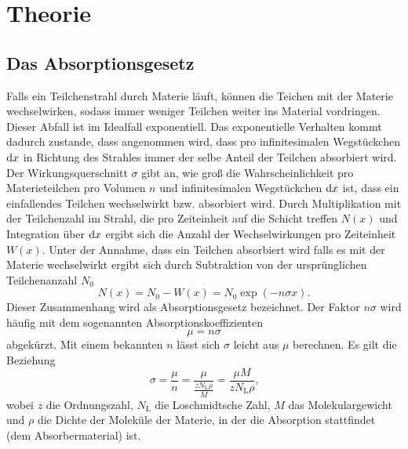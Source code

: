 
\section{Theorie}
\label{sec:Theorie}

\subsection{Das Absorptionsgesetz}
Falls ein Teilchenstrahl durch Materie läuft, können die Teichen mit der Materie wechselwirken, sodass immer weniger Teilchen weiter ins Material vordringen. Dieser Abfall ist im Idealfall exponentiell. Das exponentielle Verhalten kommt dadurch zustande, dass angenommen wird, dass pro infinitesimalen Wegstückchen $\mathop{}\!\mathrm{d} x$ in Richtung des Strahles immer der selbe Anteil der Teilchen absorbiert wird. Der Wirkungsquerschnitt $\sigma$ gibt an, wie groß die Wahrscheinlichkeit pro Materieteilchen pro Volumen $n$ und infinitesimalen Wegstückchen $\mathop{}\!\mathrm{d} x$ ist, dass ein einfallendes Teilchen wechselwirkt bzw. absorbiert wird. Durch Multiplikation mit der Teilchenzahl im Strahl, die pro Zeiteinheit auf die Schicht treffen $N(x)$ und Integration über $\mathop{}\!\mathrm{d} x$ ergibt sich die Anzahl der Wechselwirkungen pro Zeiteinheit $W(x)$. Unter der Annahme, dass ein Teilchen absorbiert wird falls es mit der Materie wechselwirkt ergibt sich durch Subtraktion von der ursprünglichen Teilchenanzahl $N_0$
\begin{equation}
	N(x)=N_0-W(x)=N_0 \exp(-n \sigma x)\text{.}
\end{equation}
Dieser Zusammenhang wird als Absorptionsgesetz bezeichnet. 
Der Faktor $n \sigma$ wird häufig mit dem sogenannten Absorptionskoeffizienten
\begin{equation}
	\mu = n \sigma
\end{equation}
abgekürzt. Mit einem bekannten $n$ lässt sich $\sigma$ leicht aus $\mu$ berechnen.
Es gilt die Beziehung
\begin{equation}
	\sigma = \frac{\mu}{n}=\frac{\mu}{\frac{z N_\text{L} \rho}{M}}=\frac{\mu M}{z N_\text{L} \rho}\text{,}\label{eq:HJHKJ}
\end{equation}
wobei $z$ die Ordnungszahl, $N_\text{L}$ die Loschmidtsche Zahl, $M$ das Molekulargewicht und $\rho$ die Dichte der Moleküle der Materie, in der die Absorption stattfindet (dem Absorbermaterial) ist.

